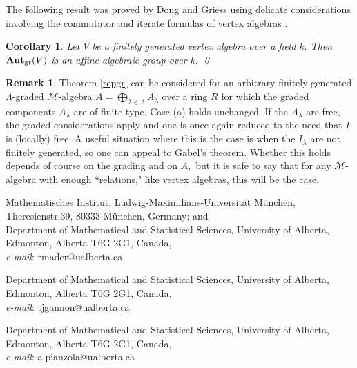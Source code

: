 \documentclass{article}
\newtheorem{cor}[thm]{Corollary}
\theoremstyle{definition}
\newtheorem{rem}[thm]{Remark}
\def\BAut{\ensuremath{\operatorname{\mathbf{Aut}}}}
\def\Mu{\ensuremath{\mathcal{M}}}
\begin{document}
 


 

The following result was proved by Dong and Griess using  delicate considerations involving the commutator and iterate formulas  of vertex algebras \cite{DongGr}.
\begin{cor} Let $V$ be a finitely generated vertex algebra over a field $k.$ Then $\BAut_{\rm gr }(V)$ is an affine algebraic group over $k.$ \qed
\end{cor}

\begin{rem} Theorem \ref{repgr} can be considered for an arbitrary finitely generated $\Lambda$-graded $\Mu$-algebra $A = \bigoplus_{\lambda \in \Lambda} A_\lambda$ over a ring $R$ for which the graded components $A_\lambda$ are of finite type. Case (a) holds unchanged. If the $A_\lambda$ are free, the graded considerations apply and one is once again reduced to the need that $I$ is (locally) free. A useful situation where this is the case is when the $I_\lambda$ are not finitely generated, so one can appeal to  Gabel's theorem.  Whether this holds depends of course on the grading and on $A,$ but it is safe to say that for any $\Mu$-algebra with enough ``relations,"  like vertex algebras, this will be the case.
\end{rem}








\small{	\noindent Mathematisches Institut, Ludwig-Maximilians-Universität München, Theresienstr.\@ 39, 80333 München, Germany; and \\ 
Department of Mathematical and Statistical Sciences, University of Alberta, Edmonton, Alberta T6G 2G1, Canada, \\
\textit{e-mail}: \textsf{rmader@ualberta.ca}

\medskip
\noindent Department of Mathematical and Statistical Sciences, University of Alberta, Edmonton, Alberta T6G 2G1, Canada, \\
\textit{e-mail}: \textsf{tjgannon@ualberta.ca}

\medskip
\noindent Department of Mathematical and Statistical Sciences, University of Alberta, Edmonton, Alberta T6G 2G1, Canada, \\
\textit{e-mail}: \textsf{a.pianzola@ualberta.ca}
}
\end{document}
